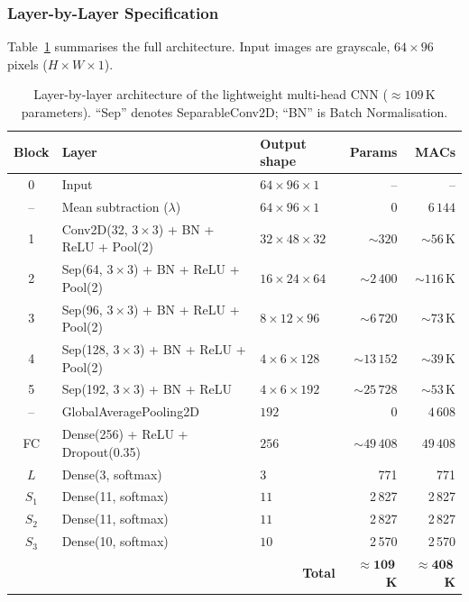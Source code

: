 \subsubsection{Layer-by-Layer Specification}
\label{sec:arch_table}

Table~\ref{tab:arch} summarises the full architecture.  Input images are
grayscale, $64{\times}96$ pixels ($H{\times}W{\times}1$).

\begin{table}[htbp]
\centering
\caption{Layer-by-layer architecture of the lightweight multi-head CNN
         ($\approx 109$\,K parameters).  ``Sep'' denotes SeparableConv2D;
         ``BN'' is Batch Normalisation.}
\label{tab:arch}
\renewcommand{\arraystretch}{1.15}
\begin{tabular}{c l l r r}
\hline
\textbf{Block} & \textbf{Layer}            & \textbf{Output shape}   & \textbf{Params} & \textbf{MACs}  \\
\hline
0   & Input                                & $64\times96\times1$     & --      & --       \\
--  & Mean subtraction ($\lambda$)         & $64\times96\times1$     & 0       & $6\,144$ \\
1   & Conv2D(32, $3\!\times\!3$) + BN + ReLU + Pool(2)   & $32\times48\times32$     & $\sim\!320$    & $\sim\!56$\,K   \\
2   & Sep(64, $3\!\times\!3$) + BN + ReLU + Pool(2)      & $16\times24\times64$     & $\sim\!2\,400$  & $\sim\!116$\,K  \\
3   & Sep(96, $3\!\times\!3$) + BN + ReLU + Pool(2)      & $8\times12\times96$      & $\sim\!6\,720$  & $\sim\!73$\,K   \\
4   & Sep(128, $3\!\times\!3$) + BN + ReLU + Pool(2)     & $4\times6\times128$      & $\sim\!13\,152$ & $\sim\!39$\,K   \\
5   & Sep(192, $3\!\times\!3$) + BN + ReLU               & $4\times6\times192$      & $\sim\!25\,728$ & $\sim\!53$\,K   \\
--  & GlobalAveragePooling2D                & $192$                  & 0       & $4\,608$ \\
FC  & Dense(256) + ReLU + Dropout(0.35)     & $256$                  & $\sim\!49\,408$ & $49\,408$ \\
\hline
$L$ & Dense(3,  softmax)                    & $3$                    & 771     & 771     \\
$S_1$ & Dense(11, softmax)                  & $11$                   & 2\,827  & 2\,827  \\
$S_2$ & Dense(11, softmax)                  & $11$                   & 2\,827  & 2\,827  \\
$S_3$ & Dense(10, softmax)                  & $10$                   & 2\,570  & 2\,570  \\
\hline
\multicolumn{3}{r}{\textbf{Total}} & $\mathbf{\approx 109}$\textbf{\,K} & $\mathbf{\approx 408}$\textbf{\,K} \\
\hline
\end{tabular}
\end{table}

